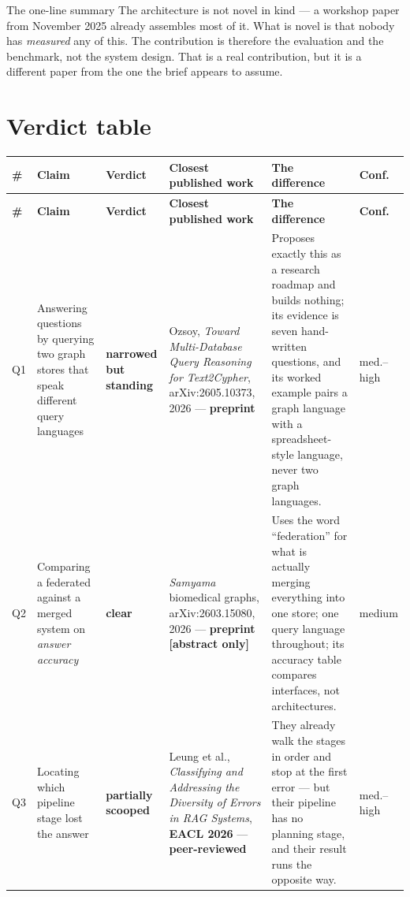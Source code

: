 \documentclass[11pt,a4paper]{article}
\newcommand{\vpartial}{\textcolor{partial}{\textbf{partially scooped}}}
\newcommand{\vstanding}{\textcolor{standing}{\textbf{narrowed but standing}}}
\newcommand{\vclear}{\textcolor{clear}{\textbf{clear}}}
\newcommand{\abstag}{\textcolor{partial}{\textbf{[abstract only]}}}
\begin{document}
\begin{keybox}{The one-line summary}
The architecture is not novel in kind --- a workshop paper from November 2025
already assembles most of it. What is novel is that nobody has \emph{measured}
any of this. The contribution is therefore the evaluation and the benchmark, not
the system design. That is a real contribution, but it is a different paper from
the one the brief appears to assume.
\end{keybox}

\section{Verdict table}

\begin{center}
\footnotesize
\begin{longtable}{@{}p{0.6cm}>{\RaggedRight}p{2.7cm}>{\RaggedRight}p{2.2cm}>{\RaggedRight}p{4.1cm}>{\RaggedRight}p{2.9cm}>{\RaggedRight}p{1.2cm}@{}}
\toprule
\textbf{\#} & \textbf{Claim} & \textbf{Verdict} & \textbf{Closest published work} & \textbf{The difference} & \textbf{Conf.} \\
\midrule
\endfirsthead
\toprule
\textbf{\#} & \textbf{Claim} & \textbf{Verdict} & \textbf{Closest published work} & \textbf{The difference} & \textbf{Conf.} \\
\midrule
\endhead

Q1 & Answering questions by querying two graph stores that speak different query languages &
\vstanding &
Ozsoy, \emph{Toward Multi-Database Query Reasoning for Text2Cypher}, arXiv:2605.10373, 2026 --- \textbf{preprint} &
Proposes exactly this as a research roadmap and builds nothing; its evidence is seven hand-written questions, and its worked example pairs a graph language with a spreadsheet-style language, never two graph languages. & med.--high \\

Q2 & Comparing a federated against a merged system on \emph{answer accuracy} &
\vclear &
\emph{Samyama} biomedical graphs, arXiv:2603.15080, 2026 --- \textbf{preprint} \abstag &
Uses the word ``federation'' for what is actually merging everything into one store; one query language throughout; its accuracy table compares interfaces, not architectures. & medium \\

Q3 & Locating which pipeline stage lost the answer &
\vpartial &
Leung et al., \emph{Classifying and Addressing the Diversity of Errors in RAG Systems}, \textbf{EACL 2026} --- \textbf{peer-reviewed} &
They already walk the stages in order and stop at the first error --- but their pipeline has no planning stage, and their result runs the opposite way. & med.--high \\


\end{longtable}
\end{center}
\end{document}

